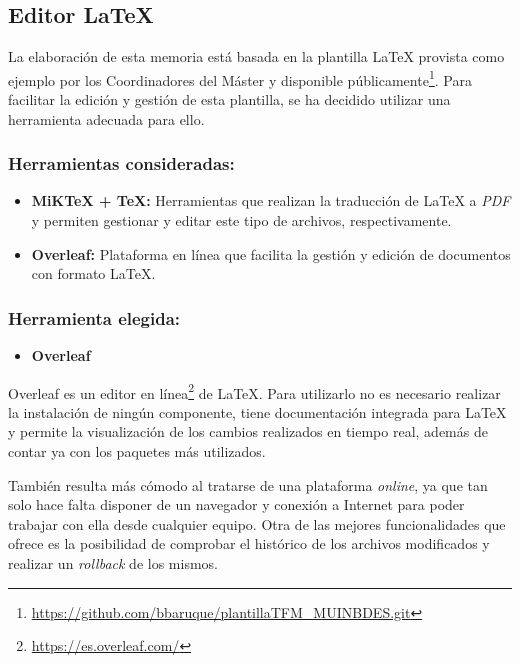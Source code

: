 \subsection{Editor \LaTeX{}}

La elaboración de esta memoria está basada en la plantilla \LaTeX{} provista como ejemplo por los Coordinadores del Máster y disponible públicamente\footnote{\url{https://github.com/bbaruque/plantillaTFM_MUINBDES.git}}. Para facilitar la edición y gestión de esta plantilla, se ha decidido utilizar una herramienta adecuada para ello. 

\subsubsection{Herramientas consideradas:}

\begin{itemize}
    \item \textbf{MiK\TeX{} + \TeX{}:} Herramientas que realizan la traducción de \LaTeX{} a \textit{PDF} y permiten gestionar y editar este tipo de archivos, respectivamente.
    \item \textbf{Overleaf:} Plataforma en línea que facilita la gestión y edición de documentos con formato \LaTeX{}.
\end{itemize}

\subsubsection{Herramienta elegida:}

\begin{itemize}
    \item \textbf{Overleaf}
\end{itemize}

Overleaf es un editor en línea\footnote{\url{https://es.overleaf.com/}} de \LaTeX{}. Para utilizarlo no es necesario realizar la instalación de ningún componente, tiene documentación integrada para \LaTeX{} y permite la visualización de los cambios realizados en tiempo real, además de contar ya con los paquetes más utilizados.

También resulta más cómodo al tratarse de una plataforma \textit{online}, ya que tan solo hace falta disponer de un navegador y conexión a Internet para poder trabajar con ella desde cualquier equipo. Otra de las mejores funcionalidades que ofrece es la posibilidad de comprobar el histórico de los archivos modificados y realizar un \textit{rollback} de los mismos.

